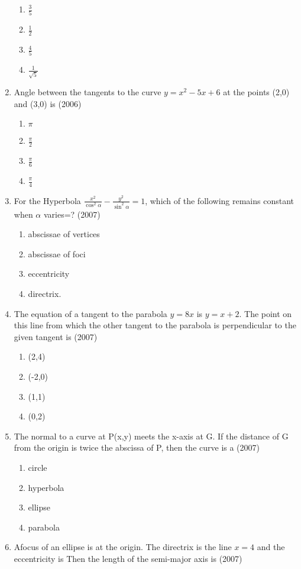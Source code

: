 \documentclass[12pt]{article}
\begin{document}
\begin{enumerate}
\begin{enumerate}
\item $\frac{3}{5}$
\item $\frac{1}{2}$
\item $\frac{4}{5}$
\item $\frac{1}{\sqrt{5}}$
\end{enumerate}
\item Angle between the tangents to the curve $y=x^2-5x+6$ at the points (2,0) and (3,0) is (2006)
\begin{enumerate}
\item $\pi$
\item $\frac{\pi}{2}$
\item $\frac{\pi}{6}$
\item $\frac{\pi}{4}$
\end{enumerate}
\item For the Hyperbola $\frac{x^2}{\cos^2\alpha}-\frac{y^2}{\sin^2\alpha}=1$, which of the following remains constant when $\alpha$ varies=? (2007)
\begin{enumerate}
\item  abscissae of vertices
\item abscissae of foci
\item  eccentricity
\item directrix.
\end{enumerate}
\item The equation of a tangent to the parabola $y= 8x$ is $y=x+2$. The point on this line from which the other tangent to the parabola is perpendicular to the given
tangent is (2007)
\begin{enumerate}
\item (2,4)
\item (-2,0)
\item (1,1)
\item (0,2)
\end{enumerate}
\item The normal to a curve at P(x,y) meets the x-axis at G. If the distance of G from the origin is twice the abscissa of P, then the curve is a (2007)
\begin{enumerate}
\item circle
\item hyperbola
\item ellipse
\item parabola 
\end{enumerate}
\item Afocus of an ellipse is at the origin. The directrix is the line $x=4$ and the eccentricity is Then the length of the semi-major axis is (2007)

\end{enumerate}
\end{document}

